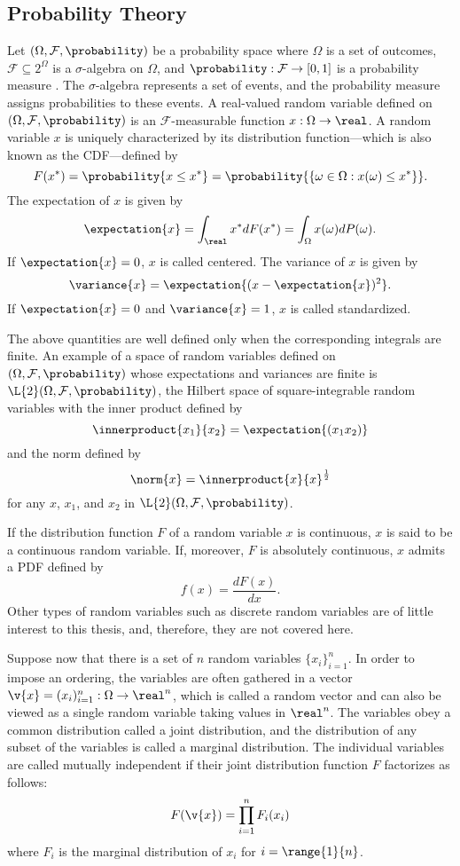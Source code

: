 \subsection{Probability Theory}

Let $(\Omega, \mathcal{F}, \probability)$ be a probability space where $\Omega$
is a set of outcomes, $\mathcal{F} \subseteq 2^\Omega$ is a $\sigma$-algebra on
$\Omega$, and $\probability: \mathcal{F} \to [0, 1]$ is a probability measure
\cite{durrett2010}. The $\sigma$-algebra represents a set of events, and the
probability measure assigns probabilities to these events. A real-valued random
variable defined on $(\Omega, \mathcal{F}, \probability)$ is an
$\mathcal{F}$-measurable function $x: \Omega \to \real$. A random variable $x$
is uniquely characterized by its distribution function---which is also known as
the \ac{CDF}---defined by
\begin{equation*}
  F(x^*) = \probability{x \leq x^*} = \probability{\{ \omega \in \Omega: x(\omega) \leq x^* \}}.
\end{equation*}
The expectation of $x$ is given by
\[
  \expectation{x} = \int_\real x^* dF(x^*) = \int_\Omega x(\omega) dP(\omega).
\]
If $\expectation{x} = 0$, $x$ is called centered. The variance of $x$ is given
by
\[
  \variance{x} = \expectation{(x - \expectation{x})^2}.
\]
If $\expectation{x} = 0$ and $\variance{x} = 1$, $x$ is called standardized.

The above quantities are well defined only when the corresponding integrals are
finite. An example of a space of random variables defined on $(\Omega,
\mathcal{F}, \probability)$ whose expectations and variances are finite is
$\L{2}(\Omega, \mathcal{F}, \probability)$, the Hilbert space of
square-integrable random variables \cite{janson1997} with the inner product
defined by
\[
  \innerproduct{x_1}{x_2} = \expectation{(x_1 x_2)}
\]
and the norm defined by
\[
  \norm{x} = \innerproduct{x}{x}^\frac{1}{2}
\]
for any $x$, $x_1$, and $x_2$ in $\L{2}(\Omega, \mathcal{F}, \probability)$.

If the distribution function $F$ of a random variable $x$ is continuous, $x$ is
said to be a continuous random variable. If, moreover, $F$ is absolutely
continuous, $x$ admits a \ac{PDF} defined by
\[
  f(x) = \frac{dF(x)}{dx}.
\]
Other types of random variables such as discrete random variables are of little
interest to this thesis, and, therefore, they are not covered here.

Suppose now that there is a set of $n$ random variables $\{ x_i \}_{i = 1}^n$.
In order to impose an ordering, the variables are often gathered in a vector
$\v{x} = (x_i)_{i = 1}^n: \Omega \to \real^n$, which is called a random vector
and can also be viewed as a single random variable taking values in $\real^n$.
The variables obey a common distribution called a joint distribution, and the
distribution of any subset of the variables is called a marginal distribution.
The individual variables are called mutually independent if their joint
distribution function $F$ factorizes as follows:
\[
  F(\v{x}) = \prod_{i = 1}^n F_i(x_i)
\]
where $F_i$ is the marginal distribution of $x_i$ for $i = \range{1}{n}$.

